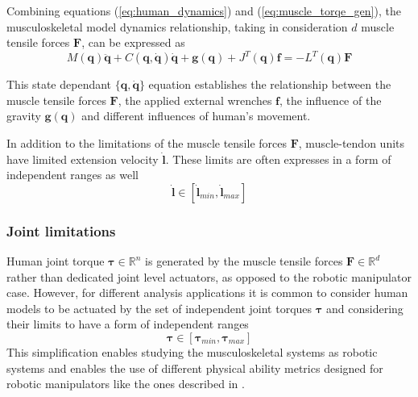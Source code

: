 Combining equations (\ref{eq:human_dynamics}) and (\ref{eq:muscle_torqe_gen}), the musculoskeletal model dynamics relationship, taking in consideration $d$ muscle tensile forces $\bm{F}$, can be expressed as
\begin{equation}
    M(\bm{q})\ddot{\bm{q}} + C(\bm{q},\dot{\bm{q}})\dot{\bm{q}} + \bm{g}(\bm{q}) + J^{T}(\bm{q})\bm{f}  = -L^{T}(\bm{q})\bm{F} 
    \label{eq:human_dyn_all}
\end{equation}

This state dependant $\{\bm{q},\dot{\bm{q}}\}$ equation establishes the relationship between the muscle tensile forces $\bm{F}$, the applied external wrenches $\bm{f}$, the influence of the gravity $\bm{g}(\bm{q})$ and different influences of human's movement. 


In addition to the limitations of the muscle tensile forces $\bm{F}$, muscle-tendon units have limited extension velocity $\dot{\bm{l}}$. These limits are often expresses in a form of independent ranges as well
\begin{equation}
    \dot{\bm{l}} \in  [\dot{\bm{l}}_{min}, \dot{\bm{l}}_{max} ]
    \label{eq:human_vel_lim}
\end{equation}

\subsubsection*{Joint limitations} Human joint torque $\bm{\tau}\in\mathbb{R}^n$ is generated by the muscle tensile forces $\bm{F}\in \mathbb{R}^d$ rather than dedicated joint level actuators, as opposed to the robotic manipulator case. However, for different analysis applications it is common to consider human models to be actuated by the set of independent joint torques $\bm{\tau}$ and considering their limits to have a form of independent ranges \cite{HOLZBAUR20072442}
\begin{equation}
    \bm{\tau} \in [\bm{\tau}_{min},\bm{\tau}_{max}]
    \label{eq:human_torque_lim}
\end{equation}
This simplification enables studying the musculoskeletal systems as robotic systems and enables the use of different physical ability metrics designed for robotic manipulators like the ones described in . 

